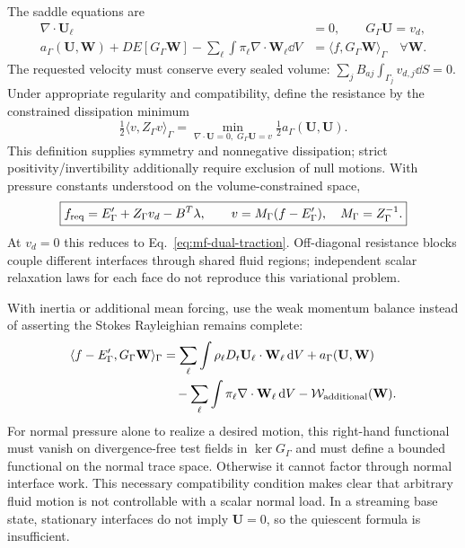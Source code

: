 The saddle equations are
\begin{align}
 \nabla\cdot\mathbf U_\ell&=0,\qquad G_\Gamma\mathbf U=v_d,
 \label{eq:mf-rayleigh-constraints}\\
 a_\Gamma(\mathbf U,\mathbf W)+DE[G_\Gamma\mathbf W]
 -\sum_\ell\int\pi_\ell\nabla\cdot\mathbf W_\ell\dd V
 &=\langle f,G_\Gamma\mathbf W\rangle_\Gamma\quad\forall\mathbf W.
 \label{eq:mf-rayleigh-weak}
\end{align}
The requested velocity must conserve every sealed volume:
$\sum_jB_{aj}\int_{\Gamma_j}v_{d,j}\dd S=0$. Under appropriate regularity
and compatibility, define the resistance by the constrained dissipation
minimum
\begin{equation}\label{eq:mf-resistance}
 \tfrac12\langle v,Z_\Gamma v\rangle_\Gamma
 =\min_{\nabla\cdot\mathbf U=0,\;G_\Gamma\mathbf U=v}
 \tfrac12a_\Gamma(\mathbf U,\mathbf U).
\end{equation}
This definition supplies symmetry and nonnegative dissipation; strict
positivity/invertibility additionally require exclusion of null motions.
With pressure constants understood on the volume-constrained space,
\begin{equation}\label{eq:mf-inverse-motion}
 \boxed{f_{\rm req}=E'_\Gamma+Z_\Gamma v_d-B^T\lambda,\qquad
 v=M_\Gamma(f-E'_\Gamma),\quad M_\Gamma=Z_\Gamma^{-1}.}
\end{equation}
At $v_d=0$ this reduces to Eq.~\eqref{eq:mf-dual-traction}. Off-diagonal
resistance blocks couple different interfaces through shared fluid regions;
independent scalar relaxation laws for each face do not reproduce this
variational problem.

With inertia or additional mean forcing, use the weak momentum balance
instead of asserting the Stokes Rayleighian remains complete:
\begin{align}
 \langle f-E'_\Gamma,G_\Gamma\mathbf W\rangle_\Gamma
 &=\sum_\ell\int\rho_\ell D_t\mathbf U_\ell\cdot\mathbf W_\ell\,\mathrm d V
 +a_\Gamma(\mathbf U,\mathbf W)\nonumber\\
 &\quad-\sum_\ell\int\pi_\ell\nabla\cdot\mathbf W_\ell\,\mathrm d V
 -\mathcal W_{\rm additional}(\mathbf W).\label{eq:mf-inertial-weak}
\end{align}
For normal pressure alone to realize a desired motion, this right-hand
functional must vanish on divergence-free test fields in $\ker G_\Gamma$
and must define a bounded functional on the normal trace space. Otherwise
it cannot factor through normal interface work. This necessary compatibility
condition makes clear that arbitrary fluid motion is not controllable with
a scalar normal load. In a streaming base state, stationary interfaces do
not imply $\mathbf U=0$, so the quiescent formula is insufficient.

